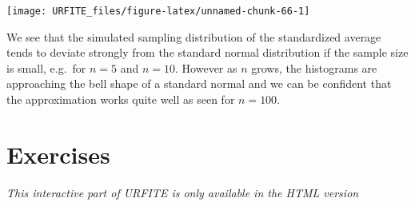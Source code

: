 \documentclass[]{book}
\theoremstyle{definition}
\theoremstyle{definition}
\theoremstyle{definition}
\theoremstyle{remark}
\begin{document}
\begin{center}\texttt{[image: URFITE\_files/figure-latex/unnamed-chunk-66-1]} \end{center}

We see that the simulated sampling distribution of the standardized
average tends to deviate strongly from the standard normal distribution
if the sample size is small, e.g.~for \(n=5\) and \(n=10\). However as
\(n\) grows, the histograms are approaching the bell shape of a standard
normal and we can be confident that the approximation works quite well
as seen for \(n=100\).

\section{Exercises}\label{exercises}

\begin{center}\textit{This interactive part of URFITE is only available in the HTML version}\end{center}


\end{document}
